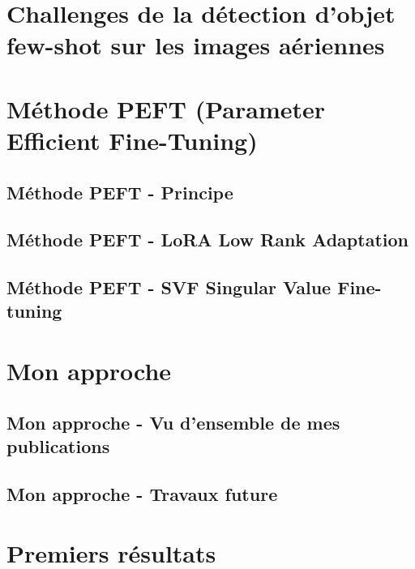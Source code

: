 \documentclass[xcolor=table, 8pt]{beamer}
\begin{document}
    \section{Challenges de la détection d'objet few-shot sur les images aériennes}\label{sec:fs-od-challenges}
    
    


    \section{Méthode PEFT (Parameter Efficient Fine-Tuning)}\label{sec:peft}

    \subsection{Méthode PEFT - Principe}\label{subsec:peft-principle}

    \subsection{Méthode PEFT - LoRA Low Rank Adaptation}\label{subsec:peft-lora}
    

    \subsection{Méthode PEFT - SVF Singular Value Fine-tuning}\label{subsec:peft-svf}
    


    \section{Mon approche}\label{sec:approach}

    \subsection{Mon approche - Vu d'ensemble de mes publications}\label{subsec:approach-publications}
    

    \subsection{Mon approche - Travaux future}\label{subsec:approach-future-work}
    

    \section{Premiers résultats}\label{sec:results}
\end{document}
